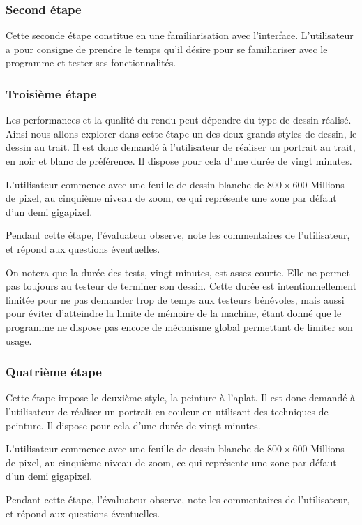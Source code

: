 			\subsubsection{Second étape}
			Cette seconde étape constitue en une familiarisation avec l'interface. L'utilisateur
			a pour consigne de prendre le temps qu'il désire pour se familiariser avec le programme
			et tester ses fonctionnalités. 

			\subsubsection{Troisième étape}
			Les performances et la qualité du rendu peut dépendre du type de dessin réalisé. Ainsi
			nous allons explorer dans cette étape un des deux grands styles de dessin, le dessin au trait.
			Il est donc demandé à l'utilisateur de réaliser un portrait au trait, en noir et blanc de préférence.
			Il dispose pour cela d'une durée de vingt minutes. 


			L'utilisateur commence avec une feuille de dessin blanche de $800 \times 600$ Millions de pixel, au cinquième
			niveau de zoom, ce qui représente une zone par défaut d'un demi gigapixel. 

			Pendant cette étape, l'évaluateur observe, note les commentaires de l'utilisateur, et répond aux questions
			éventuelles. 

			On notera que la durée des tests, vingt minutes, est assez courte. Elle ne permet pas toujours au testeur
			de terminer son dessin. Cette durée est intentionnellement limitée pour ne pas demander trop de temps aux testeurs
			bénévoles, mais aussi pour éviter d'atteindre la limite de mémoire de la machine, étant donné que 
			le programme ne dispose pas encore de mécanisme global permettant de limiter son usage. 

			\subsubsection{Quatrième étape}
			Cette étape impose le deuxième style, la peinture à l'aplat. Il est donc demandé à l'utilisateur de
			réaliser un portrait en couleur en utilisant des techniques de peinture. 
			Il dispose pour cela d'une durée de vingt minutes. 

			L'utilisateur commence avec une feuille de dessin blanche de $800 \times 600$ Millions de pixel, au cinquième
			niveau de zoom, ce qui représente une zone par défaut d'un demi gigapixel. 

			Pendant cette étape, l'évaluateur observe, note les commentaires de l'utilisateur, et répond aux questions
			éventuelles. 

